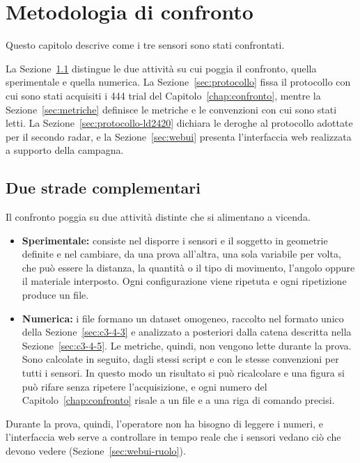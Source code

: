 \chapter{Metodologia di confronto}
\label{chap:metodologia}

Questo capitolo descrive come i tre sensori sono stati confrontati.

La Sezione~\ref{sec:metodo-approccio} distingue le due attività su cui poggia il confronto,
quella sperimentale e quella numerica. La Sezione~\ref{sec:protocollo} fissa il protocollo
con cui sono stati acquisiti i 444 trial del Capitolo~\ref{chap:confronto}, mentre la
Sezione~\ref{sec:metriche} definisce le metriche e le convenzioni con cui sono stati letti.
La Sezione~\ref{sec:protocollo-ld2420} dichiara le deroghe al protocollo adottate per il
secondo radar, e la Sezione~\ref{sec:webui} presenta l'interfaccia web realizzata a supporto
della campagna.

\section{Due strade complementari}
\label{sec:metodo-approccio}

Il confronto poggia su due attività distinte che si alimentano a vicenda.
\begin{itemize}
  \item \textbf{Sperimentale:} consiste nel disporre i sensori e il soggetto in geometrie
    definite e nel cambiare, da una prova all'altra, una sola variabile per volta, che può
    essere la distanza, la quantità o il tipo di movimento, l'angolo oppure il materiale
    interposto. Ogni configurazione viene ripetuta e ogni ripetizione produce un file.
  \item \textbf{Numerica:} i file formano un dataset omogeneo, raccolto nel formato unico
    della Sezione~\ref{sec:c3-4-3} e analizzato a posteriori dalla catena descritta nella
    Sezione~\ref{sec:c3-4-5}. Le metriche, quindi, non vengono lette durante la prova. Sono
    calcolate in seguito, dagli stessi script e con le stesse convenzioni per tutti i
    sensori. In questo modo un risultato si può ricalcolare e una figura si può rifare
    senza ripetere l'acquisizione, e ogni numero del Capitolo~\ref{chap:confronto} risale a
    un file e a una riga di comando precisi.
\end{itemize}

Durante la prova, quindi, l'operatore non ha bisogno di leggere i numeri, e l'interfaccia web serve a controllare in tempo reale che i sensori vedano ciò che devono vedere (Sezione~\ref{sec:webui-ruolo}).


